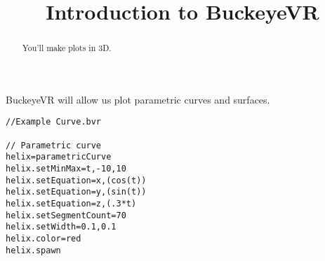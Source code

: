 \documentclass{ximera}
\title{Introduction to BuckeyeVR}
\begin{document}
\begin{abstract}
  You'll make plots in 3D.
\end{abstract}
\maketitle

BuckeyeVR will allow us plot parametric curves and surfaces.


\begin{verbatim}
//Example Curve.bvr

// Parametric curve
helix=parametricCurve
helix.setMinMax=t,-10,10
helix.setEquation=x,(cos(t))
helix.setEquation=y,(sin(t))
helix.setEquation=z,(.3*t)
helix.setSegmentCount=70
helix.setWidth=0.1,0.1
helix.color=red
helix.spawn
\end{verbatim}

\end{document}
